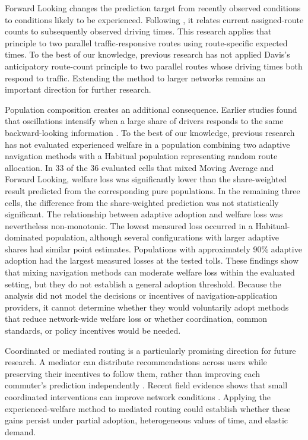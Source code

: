 \documentclass{article}
\begin{document}
Forward Looking changes the prediction target from recently observed conditions to conditions likely to be experienced. Following \textcite{davis2009}, it relates current assigned-route counts to subsequently observed driving times. This research applies that principle to two parallel traffic-responsive routes using route-specific expected times. To the best of our knowledge, previous research has not applied Davis’s anticipatory route-count principle to two parallel routes whose driving times both respond to traffic. Extending the method to larger networks remains an important direction for further research.

Population composition creates an additional consequence. Earlier studies found that oscillations intensify when a large share of drivers responds to the same backward-looking information \parencite{wahleEtAl2002,krallEtAl2021}. To the best of our knowledge, previous research has not evaluated experienced welfare in a population combining two adaptive navigation methods with a Habitual population representing random route allocation. In 33 of the 36 evaluated cells that mixed Moving Average and Forward Looking, welfare loss was significantly lower than the share-weighted result predicted from the corresponding pure populations. In the remaining three cells, the difference from the share-weighted prediction was not statistically significant. The relationship between adaptive adoption and welfare loss was nevertheless non-monotonic. The lowest measured loss occurred in a Habitual-dominated population, although several configurations with larger adaptive shares had similar point estimates. Populations with approximately 90\% adaptive adoption had the largest measured losses at the tested tolls. These findings show that mixing navigation methods can moderate welfare loss within the evaluated setting, but they do not establish a general adoption threshold. Because the analysis did not model the decisions or incentives of navigation-application providers, it cannot determine whether they would voluntarily adopt methods that reduce network-wide welfare loss or whether coordination, common standards, or policy incentives would be needed.

Coordinated or mediated routing is a particularly promising direction for future research. A mediator can distribute recommendations across users while preserving their incentives to follow them, rather than improving each commuter's prediction independently \parencite{vassermanEtAl2015}. Recent field evidence shows that small coordinated interventions can improve network conditions \parencite{aroraEtAl2026}. Applying the experienced-welfare method to mediated routing could establish whether these gains persist under partial adoption, heterogeneous values of time, and elastic demand.
\end{document}
